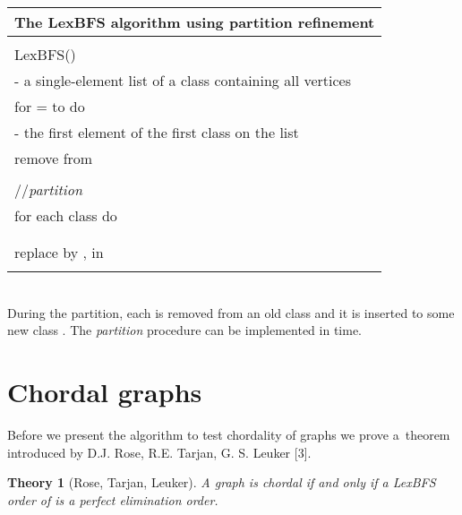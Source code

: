\documentclass[a4paper, 11pt]{article}
\newtheorem{tw}{Theory}[section]
\begin{document}
\begin{tabular}{l}
    \hline
    The LexBFS algorithm using partition refinement\\
    \hline
    \\
    LexBFS()\\
    \hspace{0.5cm}   - a single-element list of a class containing all vertices\\
    \hspace{0.5cm}  for  =  to  do\\
    \hspace{1cm}         - the first element of the first class on the list \\
    \hspace{1cm}        remove  from \\
    \hspace{1cm}        \\
    \hspace{0.5cm}  //\textit{partition}\\
    \hspace{0.5cm}  for each class  do\\
    \hspace{1cm}        \\
    \hspace{1cm}        \\
    \hspace{1cm}        replace  by ,  in \\
    \\
    \hline
\end{tabular}\\

During the partition, each  is removed from an old class  and it is inserted
to some new class . The \textit{partition} procedure can be implemented in  time.

\section{Chordal graphs}

Before we present the algorithm to test chordality of graphs we prove a~theorem introduced
by D.J. Rose, R.E. Tarjan, G. S. Leuker [3]. 



\begin{tw}[Rose, Tarjan, Leuker]
    A graph  is chordal if and only if a LexBFS order of  is a perfect elimination 
    order.
\end{tw}
\end{document}
